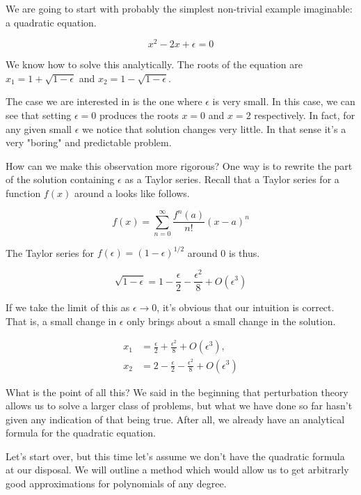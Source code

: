 \documentclass[12pt]{article}
\begin{document}
We are going to start with probably the simplest non-trivial example imaginable:
a quadratic equation.

\begin{equation}
x^2 - 2x + \epsilon = 0
\end{equation}

We know how to solve this analytically. The roots of the equation are $x_1 = 1 +
\sqrt{1 - \epsilon}$ and $x_2 = 1 - \sqrt{1 - \epsilon}$.

The case we are interested in is the one where $\epsilon$ is very small. In this
case, we can see that setting $\epsilon=0$ produces the roots $x=0$ and $x=2$
respectively. In fact, for any given small $\epsilon$ we notice that solution
changes very little. In that sense it's a very "boring" and predictable problem.

How can we make this observation more rigorous? One way is to rewrite the part
of the solution containing $\epsilon$ as a Taylor series. Recall that a Taylor
series for a function $f(x)$ around a looks like follows.

\begin{equation}
f(x) = \sum_{n=0}^{\infty} \frac{f^{n}(a)}{n!} (x-a)^n
\end{equation}

The Taylor series for $f(\epsilon) = (1 - \epsilon)^{1/2}$ around 0 is thus.

\begin{equation}
\sqrt{1 - \epsilon} = 1 - \frac{\epsilon}{2} - \frac{\epsilon^2}{8} + O(\epsilon^3)
\end{equation}

If we take the limit of this as $\epsilon \to 0$, it's obvious that our
intuition is correct. That is, a small change in $\epsilon$ only brings about a
small change in the solution.

\begin{align}
x_1 &= \frac{\epsilon}{2} + \frac{\epsilon^2}{8} + O(\epsilon^3), \\
x_2 &= 2 - \frac{\epsilon}{2} - \frac{\epsilon^2}{8} + O(\epsilon^3)
\end{align}

What is the point of all this? We said in the beginning that perturbation theory
allows us to solve a larger class of problems, but what we have done so far
hasn't given any indication of that being true. After all, we already have an
analytical formula for the quadratic equation.

Let's start over, but this time let's assume we don't have the quadratic formula
at our disposal. We will outline a method which would allow us to get arbitrarly
good approximations for polynomials of any degree.
\end{document}
